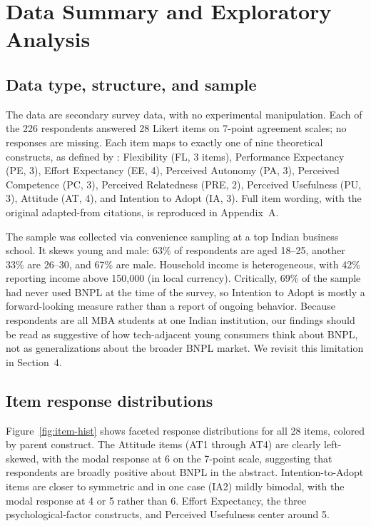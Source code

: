 \documentclass[11pt]{article}
\begin{document}
\section{Data Summary and Exploratory Analysis}
\label{sec:eda}

\subsection{Data type, structure, and sample}

The data are secondary survey data, with no experimental manipulation.
Each of the 226 respondents answered 28 Likert items on 7-point
agreement scales; no responses are missing. Each item maps to exactly
one of nine theoretical constructs, as defined by \citet{dadra2024tep}:
Flexibility (FL, 3 items), Performance Expectancy (PE, 3), Effort
Expectancy (EE, 4), Perceived Autonomy (PA, 3), Perceived Competence
(PC, 3), Perceived Relatedness (PRE, 2), Perceived Usefulness (PU, 3),
Attitude (AT, 4), and Intention to Adopt (IA, 3). Full item wording,
with the original adapted-from citations, is reproduced in
Appendix~A.

The sample was collected via convenience sampling at a top Indian
business school. It skews young and male: 63\% of respondents are
aged 18--25, another 33\% are 26--30, and 67\% are male. Household
income is heterogeneous, with 42\% reporting income above 150{,}000
(in local currency). Critically, 69\% of the sample had never used
BNPL at the time of the survey, so Intention to Adopt is mostly a
forward-looking measure rather than a report of ongoing behavior.
Because respondents are all MBA students at one Indian institution,
our findings should be read as suggestive of how tech-adjacent young
consumers think about BNPL, not as generalizations about the broader
BNPL market. We revisit this limitation in Section~4.

\subsection{Item response distributions}

Figure~\ref{fig:item-hist} shows faceted response distributions for
all 28 items, colored by parent construct. The Attitude items (AT1
through AT4) are clearly left-skewed, with the modal response at 6
on the 7-point scale, suggesting that respondents are broadly
positive about BNPL in the abstract. Intention-to-Adopt items are
closer to symmetric and in one case (IA2) mildly bimodal, with the
modal response at 4 or 5 rather than 6. Effort Expectancy, the three
psychological-factor constructs, and Perceived Usefulness center
around 5.
\end{document}

